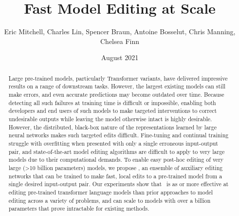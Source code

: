 \documentclass{article}
\title{Fast Model Editing at Scale}
\author{Eric Mitchell, Charles Lin, Spencer Braun, Antoine Bosselut, Chris Manning, Chelsea Finn}
\date{August 2021}
\begin{document}
\maketitle

\begin{abstract}
    Large pre-trained models, particularly Transformer variants, have delivered impressive results on a range of downstream tasks. However, the largest existing models can still make errors, and even accurate predictions may become outdated over time. Because detecting all such failures at training time is difficult or impossible, enabling both developers and end users of such models to make targeted interventions to correct undesirable outputs while leaving the model otherwise intact is highly desirable. 
    However, 
    the distributed, black-box nature of the representations learned by large neural networks makes such targeted edits difficult. Fine-tuning and continual training
    struggle with overfitting when presented with only a single erroneous input-output pair, and state-of-the-art model editing algorithms are difficult
    to apply to very large models due to their computational demands. To enable easy post-hoc editing of very large
    (\textgreater 10 billion parameters) models,
    we propose \name, an ensemble of auxiliary editing networks that can be trained to make fast, local edits to a pre-trained model from a single desired input-output pair. Our experiments show that \name~is as or more effective at editing pre-trained transformer language models than prior approaches to model editing across a variety of problems, and can scale to models with over a billion parameters that prove intractable for existing methods.
\end{abstract}
\end{document}

